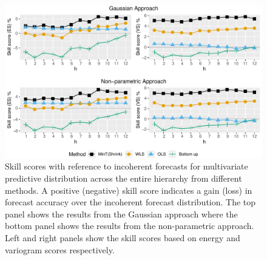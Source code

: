 \documentclass[12pt]{article}
\theoremstyle{definition}
\begin{document}
\begin{figure}
	\centering
	\small
	\includegraphics[width= .95\textwidth]{Empirical-results/AllTS_MultiVScores_ARIMA.pdf}
	\caption{Skill scores with reference to incoherent forecasts for multivariate predictive distribution across the entire hierarchy from different methods. A positive (negative) skill score indicates a gain (loss) in forecast accuracy over the incoherent forecast distribution. The top panel shows the results from the Gaussian approach where the bottom panel shows the results from the non-parametric approach. Left and right panels show the skill scores based on energy and variogram scores respectively.}\label{fig:EmpResults_AllTS}
\end{figure}
\end{document}
